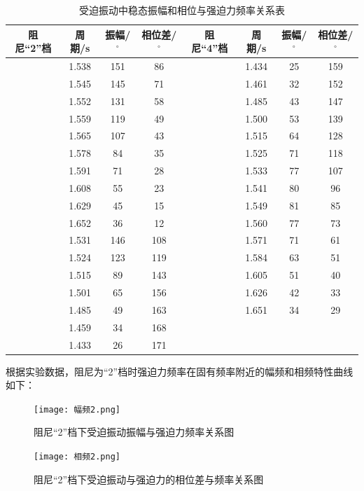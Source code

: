 \documentclass[11pt,a4paper,UTF8]{ctexart}
\begin{document}
\begin{table}[H]
	\centering\caption{受迫振动中稳态振幅和相位与强迫力频率关系表}
	\small
	\begin{tabularx}{.95\textwidth}{c|ccc|c|ccc}
	\toprule
	\textbf{阻尼“2”档} & 周期/s & 振幅/$^{\circ}$ & 相位差/$^{\circ}$ & \textbf{阻尼“4”档} & 周期/s & 振幅/$^{\circ}$ & 相位差/$^{\circ}$ \\
	\midrule
	& 1.538 & 151 & 86 & & 1.434 & 25 & 159 \\ 
	& 1.545 & 145 & 71 & & 1.461 & 32 & 152 \\
	& 1.552 & 131 & 58 & & 1.485 & 43 & 147 \\
	& 1.559 & 119 & 49 & & 1.500 & 53 & 139 \\
	& 1.565 & 107 & 43 & & 1.515 & 64 & 128 \\
	& 1.578 & 84 & 35 & & 1.525 & 71 & 118 \\
	& 1.591 & 71 & 28 & & 1.533 & 77 & 107 \\
	& 1.608 & 55 & 23 & & 1.541 & 80 & 96 \\
	& 1.629 & 45 & 15 & & 1.549 & 81 & 85 \\
	& 1.652 & 36 & 12 & & 1.560 & 77 & 73 \\
	& 1.531 & 146 & 108 & & 1.571 & 71 & 61 \\
	& 1.524 & 123 & 119 & & 1.584 & 63 & 51 \\
	& 1.515 & 89 & 143 & & 1.605 & 51 & 40 \\
	& 1.501 & 65 & 156 & & 1.626 & 42 & 33 \\
	& 1.485 & 49 & 163 & & 1.651 & 34 & 29 \\
	& 1.459 & 34 & 168 & & & & \\
	& 1.433 & 26 & 171 & & & & \\
	\bottomrule
	\end{tabularx}
\end{table}

根据实验数据，阻尼为“2”档时强迫力频率在固有频率附近的幅频和相频特性曲线如下：
\begin{figure}[h]
	\centering
	\begin{minipage}[t]{0.48\textwidth}
	\centering
	\texttt{[image: 幅频2.png]}
	\caption{阻尼“2”档下受迫振动振幅与强迫力频率关系图}
	\end{minipage}
	\begin{minipage}[t]{0.48\textwidth}
	\centering
	\texttt{[image: 相频2.png]}
	\caption{阻尼“2”档下受迫振动与强迫力的相位差与频率关系图}
	\end{minipage}
\end{figure}
\end{document}
